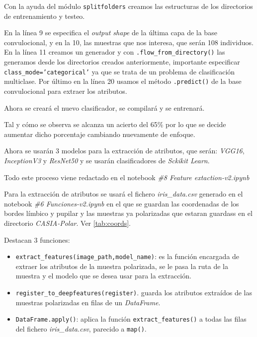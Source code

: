 Con la ayuda del módulo \texttt{splitfolders} creamos las estructuras de los directorios de entrenamiento y testeo.

En la línea 9 se especifica el \emph{output shape} de la última capa de la base convulocional, y en la 10, las muestras que nos interesa, que serán 108 individuos.
En la línea 11 creamos un generador y con \texttt{.flow\_from\_directory()} las generamos desde los directorios creados anteriormente, importante especificar \texttt{class\_mode='categorical'} ya que se trata de un problema de clasificación multiclase. Por último en la línea 20 usamos el método \texttt{.predict()} de la base convulocional para extraer los atributos.

Ahora se creará el nuevo clasificador, se compilará y se entrenará.


Tal y cómo se observa se alcanza un acierto del 65\% por lo que se decide aumentar dicho porcentaje cambiando nuevamente de enfoque.

Ahora se usarán 3 modelos  para la extracción de atributos, que serán: \emph{VGG16}, \emph{InceptionV3} y \emph{ResNet50} y se usarán clasificadores de \emph{Sckikit Learn}.

Todo este proceso viene redactado en el notebook \emph{\#8 Feature extaction-v2.ipynb}


Para la extracción de atributos se usará el fichero \emph{iris\_data.csv} generado en el notebook \emph{\#6 Funciones-v2.ipynb} en el que se guardan las coordenadas de los bordes límbico y pupilar y las muestras ya polarizadas que estaran guardass en el directorio \emph{CASIA-Polar}. Ver \ref{tab:coords}.

Destacan 3 funciones:
\begin{itemize}
    \item \texttt{extract\_features(image\_path,model\_name)}: es la función encargada de extraer los atributos de la muestra polarizada, se le pasa la ruta de la muestra y el modelo que se desea usar para la extracción.
    \item\texttt{register\_to\_deepfeatures(register)}. guarda los atributos extraídos de las muestras polarizadas en filas de un \emph{DataFrame}.
    \item\texttt{DataFrame.apply()}: aplica la función \texttt{extract\_features()} a todas las filas del fichero \emph{iris\_data.csv}, parecido a \texttt{map()}.
\end{itemize}

